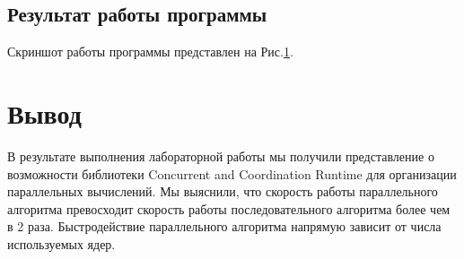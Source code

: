\documentclass[russian,utf8,pointsection]{eskdtext}
\begin{document}
       	\subsection{Результат работы программы}
       	Скриншот работы программы представлен на Рис.\ref{ris:1_1}.
       	\begin{figure}[!h]
       		\caption{}
       		\label{ris:1_1}
       	\end{figure}
       	
	\section{Вывод}
	В результате выполнения лабораторной работы мы получили представление о возможности библиотеки Concurrent and Coordination Runtime для организации параллельных вычислений.
	Мы выяснили, что скорость работы параллельного алгоритма превосходит скорость работы последовательного алгоритма более чем в 2 раза. Быстродействие параллельного алгоритма напрямую зависит от числа используемых ядер.
		
\end{document}
